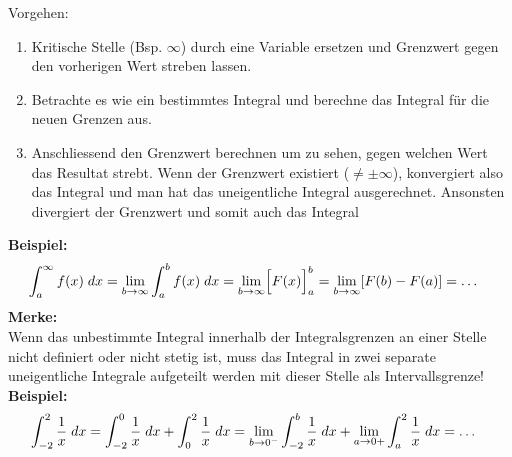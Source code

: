 Vorgehen:
\begin{enumerate}
	\item Kritische Stelle (Bsp. $\infty$) durch eine Variable ersetzen und Grenzwert gegen den vorherigen Wert streben lassen.

	\item Betrachte es wie ein bestimmtes Integral und berechne das Integral für die neuen Grenzen aus. 

	\item Anschliessend den Grenzwert berechnen um zu sehen, gegen welchen Wert das Resultat strebt. Wenn der Grenzwert existiert ($\neq \pm \infty$), konvergiert also das Integral und man hat das uneigentliche Integral ausgerechnet. Ansonsten divergiert der Grenzwert und somit auch das Integral
\end{enumerate}
{\small
\hspace{-0.35cm}
\textbf{Beispiel:}
\vspace{-0.2cm}
\begin{align*}
	\hspace{-0.35cm} \int_{a}^{\infty} f(x) \; dx = \lim_{b \to \infty} \int_a^b f(x) \; dx = \lim_{b \to \infty} \Bigl[ F(x) \Bigr]_a^b = \lim_{b \to \infty} [F(b) - F(a)] = \dots
\end{align*}}\textbf{Merke:} \\
Wenn das unbestimmte Integral innerhalb der Integralsgrenzen an einer Stelle nicht definiert oder nicht stetig ist, muss das Integral in zwei separate uneigentliche Integrale aufgeteilt werden mit dieser Stelle als Intervallsgrenze! \\

{\small
\hspace{-0.35cm}
\textbf{Beispiel:}
\vspace{-0.2cm}
\begin{align*}
	\hspace{-0.35cm} \int_{-2}^{2} \frac{1}{x} \; dx = \int_{-2}^{0} \frac{1}{x} \; dx + \int_{0}^{2} \frac{1}{x} \; dx = \lim_{b \to 0^-} \int_{-2}^{b} \frac{1}{x} \; dx + \lim_{a \to 0+} \int_{a}^{2} \frac{1}{x} \; dx = \dots
\end{align*}}




